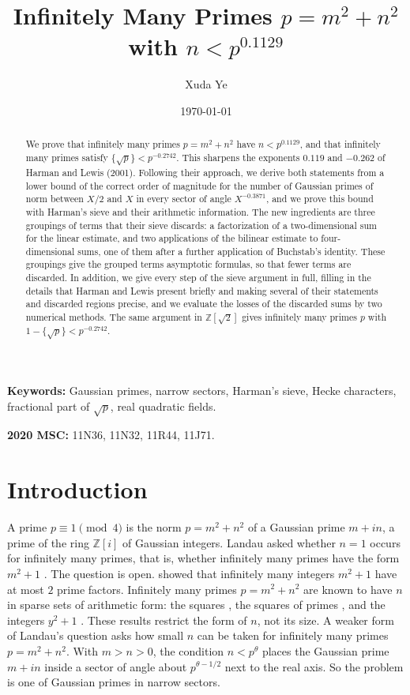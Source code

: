 \documentclass{article}
\title{Infinitely Many Primes $p=m^2+n^2$ with $n<p^{0.1129}$}
\author{Xuda Ye}
\affil{Department of Mathematics, Purdue University, West Lafayette, IN 47907}
\date{\today}
\numberwithin{equation}{section}
\begin{document}
\maketitle

\begin{abstract}
We prove that infinitely many primes $p = m^2 + n^2$ have $n < p^{0.1129}$, and that infinitely many primes satisfy $\{\sqrt{p}\} < p^{-0.2742}$. This sharpens the exponents $0.119$ and $-0.262$ of Harman and Lewis (2001). Following their approach, we derive both statements from a lower bound of the correct order of magnitude for the number of Gaussian primes of norm between $X/2$ and $X$ in every sector of angle $X^{-0.3871}$, and we prove this bound with Harman's sieve and their arithmetic information. The new ingredients are three groupings of terms that their sieve discards: a factorization of a two-dimensional sum for the linear estimate, and two applications of the bilinear estimate to four-dimensional sums, one of them after a further application of Buchstab's identity. These groupings give the grouped terms asymptotic formulas, so that fewer terms are discarded. In addition, we give every step of the sieve argument in full, filling in the details that Harman and Lewis present briefly and making several of their statements and discarded regions precise, and we evaluate the losses of the discarded sums by two numerical methods. The same argument in $\mathbb{Z}[\sqrt{2}]$ gives infinitely many primes $p$ with $1 - \{\sqrt{p}\} < p^{-0.2742}$.
\end{abstract}

\textbf{Keywords:} Gaussian primes, narrow sectors, Harman's sieve, Hecke characters, fractional part of $\sqrt{p}$, real quadratic fields.

\textbf{2020 MSC:} 11N36, 11N32, 11R44, 11J71.

\section{Introduction}
\label{sec: introduction}

A prime $p \equiv 1 \pmod 4$ is the norm $p = m^2 + n^2$ of a Gaussian prime $m + in$, a prime of the ring $\mathbb{Z}[i]$ of Gaussian integers. Landau asked whether $n = 1$ occurs for infinitely many primes, that is, whether infinitely many primes have the form $m^2 + 1$ \citep{pintz2009landau}. The question is open. \citet{iwaniec1978almost} showed that infinitely many integers $m^2 + 1$ have at most $2$ prime factors. Infinitely many primes $p = m^2 + n^2$ are known to have $n$ in sparse sets of arithmetic form: the squares \citep{friedlander1998polynomial}, the squares of primes \citep{heathbrown2017prime}, and the integers $y^2 + 1$ \citep{merikoski2023polynomials}. These results restrict the form of $n$, not its size. A weaker form of Landau's question asks how small $n$ can be taken for infinitely many primes $p = m^2 + n^2$. With $m > n > 0$, the condition $n < p^{\theta}$ places the Gaussian prime $m + in$ inside a sector of angle about $p^{\theta - 1/2}$ next to the real axis. So the problem is one of Gaussian primes in narrow sectors.
\end{document}
